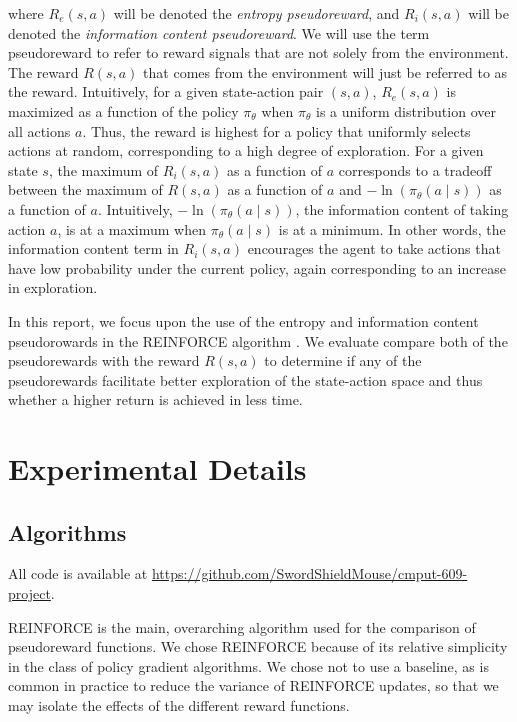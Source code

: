 \documentclass{article}
\begin{document}
  where $R_e(s, a)$ will be denoted the \textit{entropy pseudoreward}, and $R_i(s, a)$ will be denoted the \textit{information content pseudoreward}. We will use the term pseudoreward to refer to reward signals that are not solely from the environment. The reward $R(s, a)$ that comes from the environment will just be referred to as the reward. Intuitively, for a given state-action pair $(s, a)$, $R_e(s, a)$ is maximized as a function of the policy $\pi_\theta$ when $\pi_\theta$ is a uniform distribution over all actions $a$. Thus, the reward is highest for a policy that uniformly selects actions at random, corresponding to a high degree of exploration. For a given state $s$, the maximum of $R_i(s, a)$ as a function of $a$ corresponds to a tradeoff between the maximum of $R(s, a)$ as a function of $a$ and $- \ln\left(\pi_\theta(a \mid s)\right)$ as a function of $a$. Intuitively, $- \ln\left(\pi_\theta(a \mid s)\right)$, the information content of taking action $a$, is at a maximum when $\pi_\theta(a \mid s)$ is at a minimum. In other words, the information content term in $R_i(s, a)$ encourages the agent to take actions that have low probability under the current policy, again corresponding to an increase in exploration.

  In this report, we focus upon the use of the entropy and information content pseudorowards in the REINFORCE algorithm \citep{williams1992simple}. We evaluate compare both of the pseudorewards with the reward $R(s, a)$ to determine if any of the pseudorewards facilitate better exploration of the state-action space and thus whether a higher return is achieved in less time.

  \section{Experimental Details}
  \subsection{Algorithms}
  All code is available at \url{https://github.com/SwordShieldMouse/cmput-609-project}.

  REINFORCE is the main, overarching algorithm used for the comparison of pseudoreward functions. We chose REINFORCE because of its relative simplicity in the class of policy gradient algorithms. We chose not to use a baseline, as is common in practice to reduce the variance of REINFORCE updates, so that we may isolate the effects of the different reward functions.
\end{document}
